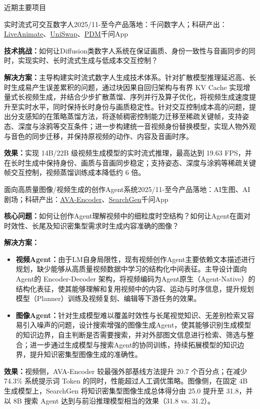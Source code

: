 \documentclass{resume} %
\begin{document}
\begin{rSection}{近期主要项目}
\begin{rSubsection}{\hspace*{-1.5em}实时流式可交互数字人}{2025/11-至今}{产品落地：千问数字人；科研产出：\href{https://liveanimate.github.io/}{LiveAnimate}、\href{https://uniswap-av.github.io/}{UniSwap}、\href{https://rethinking-cfg-opd.github.io/}{PDM}}{千问App}
\item {\bf 技术挑战：}如何让Diffusion类数字人系统在保证画质、身份一致性与音画同步的同时，实现实时、长时流式生成与低成本交互控制？
\item {\bf 解决方案：}主导构建实时流式数字人生成技术体系。针对扩散模型推理延迟高、长时生成易产生误差累积的问题，通过块因果自回归架构与有界 KV Cache 实现增量式长视频生成，并结合少步扩散蒸馏、序列并行及算子优化，将视频生成速度提升至实时水平，同时保持长时身份与画质稳定性。针对交互控制成本高的问题，提出分支感知的在策略蒸馏方法，将逐帧稠密控制能力迁移至稀疏关键帧，支持姿态、深度与涂鸦等交互条件；进一步构建统一音视频身份替换模型，实现人物外观与音色的同步迁移，并保持原视频的动作、内容及音画时序。
\item {\bf 效果：}实现 14B/22B 级视频生成模型的实时流式推理，最高达到 19.63 FPS，并在长时生成中保持身份、画质与音画同步稳定；支持姿态、深度与涂鸦等稀疏关键帧交互控制，视频蒸馏训练成本降低约 6 倍。
\end{rSubsection}

\begin{rSubsection}{\hspace*{-1.5em}面向高质量图像/视频生成的创作Agent系统}{2025/11-至今}{产品落地：AI生图、AI剧场；科研产出：\href{https://ava-encoder.github.io/}{AVA-Encoder}、\href{https://haozheh3.github.io/SearchGen/}{SearchGen}}{千问App}
\item {\bf 核心问题：}如何让创作Agent理解视频中的细粒度时空结构？如何让Agent在面对时效性、长尾及知识密集型需求时生成内容准确的图像？
\item {\bf 解决方案：}
\begin{itemize}
\setlength{\itemsep}{0em}
\setlength{\topsep}{0em}
\setlength{\parsep}{0em}
\item {\bf 视频Agent：}由于LM自身局限性，现有视频创作Agent主要依赖文本描述进行规划，缺少能够从高质量视频数据中学习的结构化中间表征。主导设计面向Agent的 Encoder-Decoder 架构，将视频编码为Agent原生（Agent-Native）的结构化表征，使其能够理解和复用视频中的内容、运动与时序信息，提升规划模型（Planner）训练及视频复刻、编辑等下游任务的效果。
\item {\bf 图像Agent：}针对生成模型难以覆盖时效性与长尾视觉知识、无差别检索又容易引入噪声的问题，设计搜索增强的图像生成Agent，使其能够识别生成模型的知识边界，自主判断是否需要搜索，并对外部图文信息进行检索、筛选与整合；进一步通过生成模型与搜索Agent的协同训练，持续拓展模型的知识边界，提升知识密集型图像生成的准确性。
\end{itemize}
\item {\bf 效果：}视频侧，AVA-Encoder 较最强外部基线方法提升 20.7 个百分点；在减少 74.3\% 系统提示词 Token 的同时，性能超过人工调优策略。图像侧，在固定 4B 生成模型上，SearchGen 将知识密集型图像生成总体得分由 25.0 提升至 31.8，并以 8B 搜索 Agent 达到与前沿推理模型相当的效果（31.8 vs. 31.2）。
\end{rSubsection}


\end{rSection}
\end{document}
